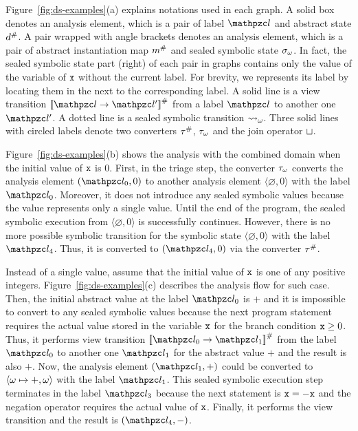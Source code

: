Figure~\ref{fig:ds-examples}(a) explains notations used in each graph. A solid
box denotes an analysis element, which is a pair of label $\lab$ and abstract
state ${d}^{\#}$.  A pair wrapped with angle brackets denotes an analysis
element, which is a pair of abstract instantiation map ${m}^{\#}$ and sealed
symbolic state ${\sigma}_\omega$.  In fact, the sealed symbolic state part (right) of
each pair in graphs contains only the value of the variable of $\texttt{x}$ without
the current label.  For brevity, we represents its label by locating them in the
next to the corresponding label.  A solid line is a view transition
$\viewtrans{\lab}{\lab'}$ from a label $\lab$ to another one $\lab'$.  A dotted
line is a sealed symbolic transition ${\leadsto}_\omega$.  Three solid lines with
circled labels denote two converters ${\tau}^{\#}$, ${\tau}_\omega$ and the join
operator $\sqcup$.

Figure~\ref{fig:ds-examples}(b) shows the analysis with the combined domain when
the initial value of $\texttt{x}$ is $0$.  First, in the triage step,
the converter ${\tau}_\omega$ converts the analysis element $(\lab_0, 0)$ to
another analysis element $\langle \varnothing, 0 \rangle$ with the label
$\lab_0$.  Moreover, it does not introduce any sealed symbolic values because
the value represents only a single value.  Until the end of the program, the
sealed symbolic execution from $\langle \varnothing, 0 \rangle$ is successfully
continues.  However, there is no more possible symbolic transition for the
symbolic state $\langle \varnothing, 0 \rangle$ with the label $\lab_4$.  Thus,
it is converted to $(\lab_4, 0)$ via the converter ${\tau}^{\#}$.

Instead of a single value, assume that the initial value of $\texttt{x}$ is one of
any positive integers.  Figure~\ref{fig:ds-examples}(c) describes the analysis
flow for such case.  Then, the initial abstract value at the label $\lab_0$ is
$+$ and it is impossible to convert to any sealed symbolic values because the
next program statement requires the actual value stored in the variable $\texttt{x}$
for the branch condition $\texttt{x} \geq 0$.  Thus, it performs view transition
$\viewtrans{\lab_0}{\lab_1}$ from the label $\lab_0$ to another one $\lab_1$ for
the abstract value $+$ and the result is also $+$.  Now, the analysis element
$(\lab_1, +)$ could be converted to $\langle \omega \mapsto +, \omega \rangle$
with the label $\lab_1$.  This sealed symbolic execution step terminates in the
label $\lab_3$ because the next statement is $\texttt{x} = -\texttt{x}$ and the negation
operator requires the actual value of $\texttt{x}$.  Finally, it performs the view
transition and the result is $(\lab_4, -)$.

